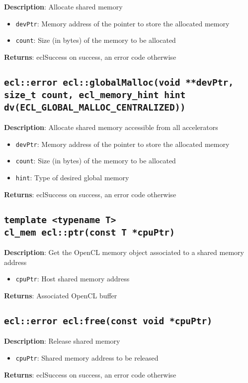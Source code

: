 \textbf{Description}: Allocate shared memory
\begin{itemize}
  \item \texttt{devPtr}: Memory address of the pointer to store the allocated memory
  \item \texttt{count}: Size (in bytes) of the memory to be allocated
\end{itemize}
\textbf{Returns}: eclSuccess on success, an error code otherwise

\subsection{\texttt{ecl::error ecl::globalMalloc(void **devPtr, size\_t count, ecl\_memory\_hint 
hint dv(ECL\_GLOBAL\_MALLOC\_CENTRALIZED))}}

\textbf{Description}: Allocate shared memory accessible from all accelerators
\begin{itemize}
  \item \texttt{devPtr}: Memory address of the pointer to store the allocated memory
  \item \texttt{count}: Size (in bytes) of the memory to be allocated
  \item \texttt{hint}: Type of desired global memory
\end{itemize}
\textbf{Returns}: eclSuccess on success, an error code otherwise

\subsection{\texttt{template <typename T>\\cl\_mem ecl::ptr(const T *cpuPtr)}}

\textbf{Description}: Get the OpenCL memory object associated to a shared memory address
\begin{itemize}
  \item \texttt{cpuPtr}: Host shared memory address
\end{itemize}
\textbf{Returns}: Associated OpenCL buffer

\subsection{\texttt{ecl::error ecl:free(const void *cpuPtr)}}

\textbf{Description}: Release shared memory
\begin{itemize}
  \item \texttt{cpuPtr}: Shared memory address to be released
\end{itemize}
\textbf{Returns}: eclSuccess on success, an error code otherwise

